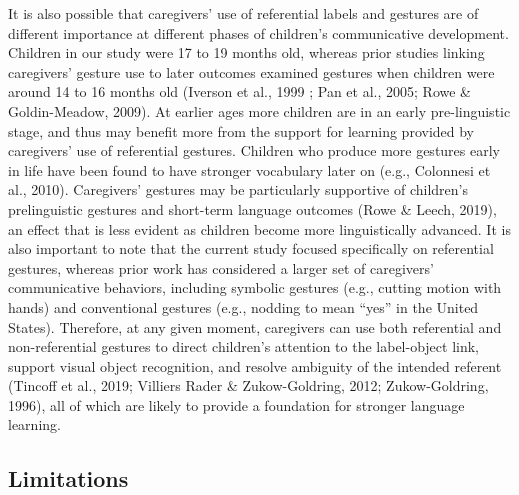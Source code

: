 \documentclass[
  english,
  man,floatsintext]{apa6}
\begin{document}
It is also possible that caregivers' use of referential labels and gestures are of different importance at different phases of children's communicative development. Children in our study were 17 to 19 months old, whereas prior studies linking caregivers' gesture use to later outcomes examined gestures when children were around 14 to 16 months old (Iverson et al., 1999 ; Pan et al., 2005; Rowe \& Goldin-Meadow, 2009). At earlier ages more children are in an early pre-linguistic stage, and thus may benefit more from the support for learning provided by caregivers' use of referential gestures. Children who produce more gestures early in life have been found to have stronger vocabulary later on (e.g., Colonnesi et al., 2010). Caregivers' gestures may be particularly supportive of children's prelinguistic gestures and short-term language outcomes (Rowe \& Leech, 2019), an effect that is less evident as children become more linguistically advanced. It is also important to note that the current study focused specifically on referential gestures, whereas prior work has considered a larger set of caregivers' communicative behaviors, including symbolic gestures (e.g., cutting motion with hands) and conventional gestures (e.g., nodding to mean \enquote{yes} in the United States). Therefore, at any given moment, caregivers can use both referential and non-referential gestures to direct children's attention to the label-object link, support visual object recognition, and resolve ambiguity of the intended referent (Tincoff et al., 2019; Villiers Rader \& Zukow-Goldring, 2012; Zukow-Goldring, 1996), all of which are likely to provide a foundation for stronger language learning.

\hypertarget{limitations}{%
\subsection{Limitations}\label{limitations}}
\end{document}
